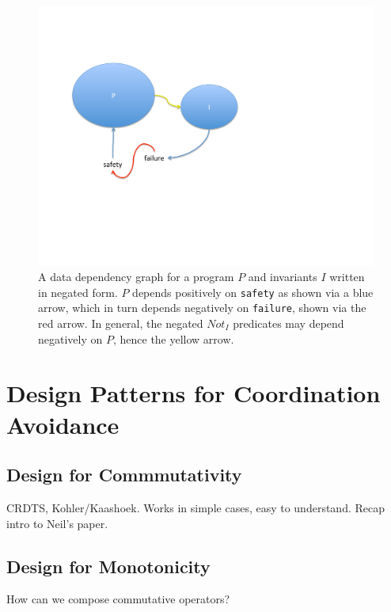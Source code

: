 \documentclass{sig-alternate}
\begin{document}
\begin{figure}[t]
\centering
\includegraphics[width=0.9\linewidth]{invariant-rewrite.pdf}
\vspace{-10pt}
\caption{A data dependency graph for a program $P$ and invariants $I$ written in negated form.  $P$ depends positively on \texttt{safety} as shown via a blue arrow, which in turn depends negatively on \texttt{failure}, shown via the red arrow.  In general, the negated $Not_I$ predicates may depend negatively on $P$, hence the yellow arrow.}
\label{fig:invariant-rewrite}
\vspace{-2pt}
\end{figure}

\section{Design Patterns for Coordination Avoidance}
\label{sec:patterns}

\subsection{Design for Commmutativity}
CRDTS, Kohler/Kaashoek.  Works in simple cases, easy to understand.  Recap intro to Neil's paper.
\subsection{Design for Monotonicity}
How can we compose commutative operators?  



\end{document}
